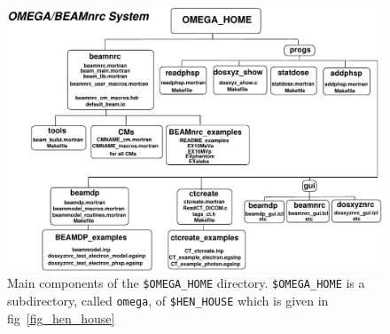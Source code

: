 \documentclass[12pt,twoside]{article}
\begin{document}
\begin{figure}[hbp]
\begin{center}
\leavevmode
\mbox{}\hspace{0cm}
\includegraphics[width=17cm]{figures/omega_home}
\caption[Components of {\tt \$OMEGA\_HOME} subdirectory.]
{Main components of the {\tt \$OMEGA\_HOME} directory.
{\tt \$OMEGA\_HOME} is a subdirectory, called {\tt omega}, of
{\tt \$HEN\_HOUSE} which is given in fig~\ref{fig_hen_house}}
\label{fig_omega_home}
\end{center}
\end{figure}
\end{document}
